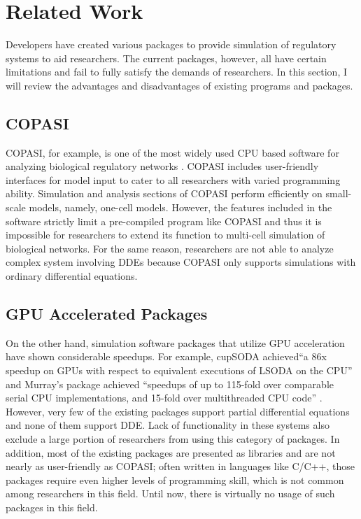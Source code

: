 \documentclass[../thesis.tex]{subfiles}
\begin{document}
\chapter{Related Work}
\label{ch:relatedwork}
Developers have created various packages to provide simulation of regulatory systems to aid researchers. The current packages, however, all have certain limitations and fail to fully satisfy the demands of researchers. In this section, I will review the advantages and disadvantages of existing programs and packages.

\section{COPASI}
	COPASI, for example, is one of the most widely used CPU based software for analyzing biological regulatory networks \cite{hoops2006copasi}. COPASI includes user-friendly interfaces for model input to cater to all researchers with varied programming ability. Simulation and analysis sections of COPASI perform efficiently on small-scale models, namely, one-cell models. However, the features included in the software strictly limit a pre-compiled program like COPASI and thus it is impossible for researchers to extend its function to multi-cell simulation of biological networks. For the same reason, researchers are not able to analyze complex system involving DDEs because COPASI only supports simulations with ordinary differential equations. 
\section{GPU Accelerated Packages}
On the other hand, simulation software packages that utilize GPU acceleration have shown considerable speedups. For example, cupSODA achieved``a 86x speedup on GPUs with respect to equivalent executions of LSODA on the CPU'' and Murray's package achieved ``speedups of up to 115-fold over comparable serial CPU implementations, and 15-fold over multithreaded CPU code'' \cite{nobile2012gpu,hoang2013novel,murray2012gpu}. However, very few of the existing packages support partial differential equations and none of them support DDE. Lack of functionality in these systems also exclude a large portion of researchers from using this category of packages. In addition, most of the existing packages are presented as libraries and are not nearly as user-friendly as COPASI; often written in languages like C/C++, those packages require even higher levels of programming skill, which is not common among researchers in this field. Until now, there is virtually no usage of such packages in this field.
\end{document}
